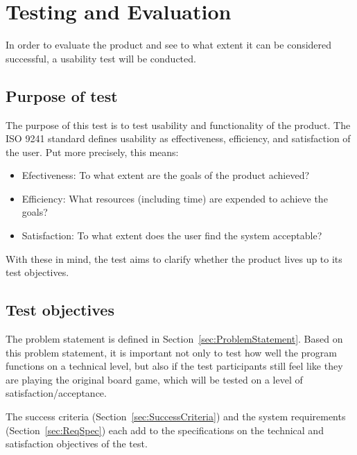\chapter{Testing and Evaluation}\label{ch:testeval}
In order to evaluate the product and see to what extent it can be considered successful, a usability test will be conducted.

\section{Purpose of test}
The purpose of this test is to test usability and functionality of the product. The ISO 9241 \citep{ISO} standard defines usability as effectiveness, efficiency, and satisfaction of the user. Put more precisely, this means:
\begin{itemize}
\item Efectiveness: To what extent are the goals of the product achieved?
\item Efficiency: What resources (including time) are expended to achieve the goals?
\item Satisfaction: To what extent does the user find the system acceptable?
\end{itemize}
With these in mind, the test aims to clarify whether the product lives up to its test objectives.

\section{Test objectives}\label{sec:TestObjectives}
The problem statement is defined in Section~\ref{sec:ProblemStatement}. Based on this problem statement, it is important not only to test how well the program functions on a technical level, but also if the test participants still feel like they are playing the original board game, which will be tested on a level of satisfaction/acceptance.

The success criteria (Section~\ref{sec:SuccessCriteria}) and the system requirements (Section~\ref{sec:ReqSpec}) each add to the specifications on the technical and satisfaction  objectives of the test.

